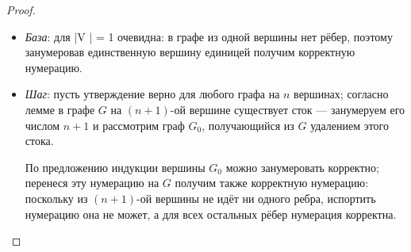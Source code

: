 \documentclass[a4paper]{article}
\begin{document}
\begin{colloq}
\begin{proof}
            \begin{itemize}
                \item
                \emph{База}: для |V | = 1 очевидна: в графе из одной вершины нет рёбер, поэтому занумеровав единственную вершину единицей получим корректную нумерацию.

                \item
                \emph{Шаг}: пусть утверждение верно для любого графа на $n$ вершинах; согласно лемме в графе $G$ на $(n + 1)$-ой вершине существует сток --- занумеруем его числом $n + 1$ и рассмотрим граф $G_0$, получающийся из $G$ удалением этого стока. 

                По предложению индукции вершины $G_0$ можно занумеровать корректно; перенеся эту нумерацию на $G$ получим также корректную нумерацию: поскольку из $(n + 1)$-ой вершины не идёт ни одного ребра, испортить нумерацию она не может, а для всех остальных рёбер нумерация корректна.
            \end{itemize}
        \end{proof}

    \end{colloq}
\end{document}
